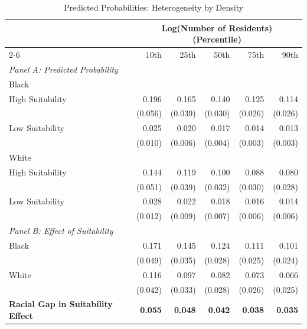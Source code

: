 \begin{table}[h]
\centering
\caption{Predicted Probabilities: Heterogeneity by Density}
\label{tab:heterogeneity/suitabilityxblacksharexnumprec}
\begin{threeparttable}
\begin{tabular*}{1\textwidth}{@{\extracolsep{\fill}}lr@{\hspace{1.2em}}r@{\hspace{1.2em}}r@{\hspace{1.2em}}r@{\hspace{1.2em}}r@{\hspace{1.2em}}}
\toprule
 & \multicolumn{5}{c}{Log(Number of Residents) (Percentile)} \\
\cmidrule(l){2-6}
 & 10th & 25th & 50th & 75th & 90th \\
\midrule
\textit{Panel A: Predicted Probability} & & & & & \\
\addlinespace[2pt]
Black & & & & & \\
\quad High Suitability & 0.196 & 0.165 & 0.140 & 0.125 & 0.114 \\
 & (0.056) & (0.039) & (0.030) & (0.026) & (0.026) \\[4pt]
\quad Low Suitability & 0.025 & 0.020 & 0.017 & 0.014 & 0.013 \\
 & (0.010) & (0.006) & (0.004) & (0.003) & (0.003) \\[4pt]
White & & & & & \\
\quad High Suitability & 0.144 & 0.119 & 0.100 & 0.088 & 0.080 \\
 & (0.051) & (0.039) & (0.032) & (0.030) & (0.028) \\[4pt]
\quad Low Suitability & 0.028 & 0.022 & 0.018 & 0.016 & 0.014 \\
 & (0.012) & (0.009) & (0.007) & (0.006) & (0.006) \\[4pt]
\midrule
\textit{Panel B: Effect of Suitability} & & & & & \\
\addlinespace[2pt]
Black & 0.171\rlap{$^{***}$} & 0.145\rlap{$^{***}$} & 0.124\rlap{$^{***}$} & 0.111\rlap{$^{***}$} & 0.101\rlap{$^{***}$} \\
 & (0.049) & (0.035) & (0.028) & (0.025) & (0.024) \\[4pt]
White & 0.116\rlap{$^{***}$} & 0.097\rlap{$^{***}$} & 0.082\rlap{$^{***}$} & 0.073\rlap{$^{***}$} & 0.066\rlap{$^{***}$} \\
 & (0.042) & (0.033) & (0.028) & (0.026) & (0.025) \\[4pt]
\addlinespace[2pt]
\textbf{Racial Gap in Suitability Effect} & \textbf{0.055}\rlap{$^{*}$} & \textbf{0.048}\rlap{$^{*}$} & \textbf{0.042}\rlap{$^{**}$} & \textbf{0.038}\rlap{$^{**}$} & \textbf{0.035}\rlap{$^{**}$} \\

\end{tabular*}
\end{threeparttable}
\end{table}
